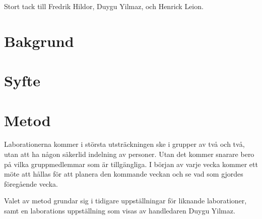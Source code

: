 \documentclass{article}
\begin{document}
\newpage 
\thispagestyle{empty}
\setcounter{page}{3}
\hspace{0pt}
\vfill
\begin{centering}
\Large Stort tack till Fredrik Hildor, Duygu Yilmaz, och Henrick Leion.
\vfill
\end{centering}
\hspace{0pt}
\begin{centering}
\end{centering}
\newpage
\thispagestyle{empty}
\thispagestyle{empty}
\tableofcontents
\thispagestyle{empty}
\newpage
{}
\section{Bakgrund}

\section{Syfte}

\section{Metod}

Laborationerna kommer i största utsträckningen ske i grupper av två och två, utan att ha någon säkerlid indelning av personer. Utan det kommer snarare bero på vilka gruppmedlemmar som är tillgängliga. I början av varje vecka kommer ett möte att hållas för att planera den kommande veckan och se vad som gjordes föregående vecka. 

Valet av metod grundar sig i tidigare uppställningar för liknande laborationer, samt en laborations uppställning som visas av handledaren Duygu Yilmaz\cite{Aarabi-Karasgani2010}. 
\end{document}
